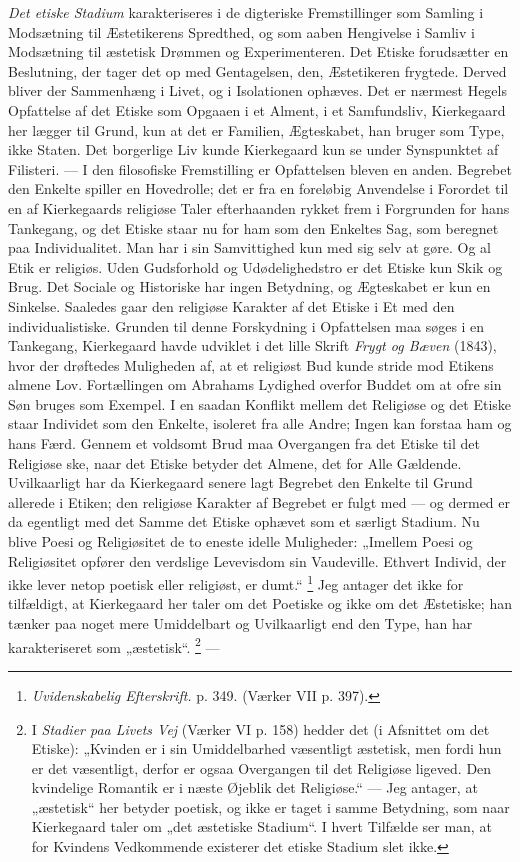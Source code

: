 \documentclass[12pt,a4paper,openany]{book}
\newcommand{\opage}[1]{\marginnote{\footnotesize\textit{[#1]}}}
\begin{document}
\textit{Det etiske Stadium} karakteriseres i de digteriske Fremstillinger som
Samling i Modsætning til Æstetikerens Spredthed, og som aaben Hengivelse i
Samliv i Modsætning til æstetisk Drømmen og Experimenteren. Det Etiske
forudsætter en Beslutning, der tager det op med Gentagelsen, den, Æstetikeren
frygtede. Derved bliver der Sammenhæng i Livet, og i Isolationen ophæves. Det
er nærmest Hegels Opfattelse af det
\setcounter{footnote}{0}%
\opage{159}Etiske som Opgaaen i et Alment, i et Samfundsliv, Kierkegaard her
lægger til Grund, kun at det er Familien, Ægteskabet, han bruger som Type, ikke
Staten. Det borgerlige Liv kunde Kierkegaard kun se under Synspunktet af
Filisteri. --- I den filosofiske Fremstilling er Opfattelsen bleven en anden.
Begrebet den Enkelte spiller en Hovedrolle; det er fra en foreløbig Anvendelse
i Forordet til en af Kierkegaards religiøse Taler efterhaanden rykket frem i
Forgrunden for hans Tankegang, og det Etiske staar nu for ham som den Enkeltes
Sag, som beregnet paa Individualitet. Man har i sin Samvittighed kun med sig
selv at gøre. Og al Etik er religiøs. Uden Gudsforhold og Udødelighedstro er
det Etiske kun Skik og Brug. Det Sociale og Historiske har ingen Betydning, og
Ægteskabet er kun en Sinkelse. Saaledes gaar den religiøse Karakter af det
Etiske i Et med den individualistiske. Grunden til denne Forskydning i
Opfattelsen maa søges i en Tankegang, Kierkegaard havde udviklet i det lille
Skrift \textit{Frygt og Bæven} (1843), hvor der drøftedes Muligheden af, at et
religiøst Bud kunde stride mod Etikens almene Lov. Fortællingen om Abrahams
Lydighed overfor Buddet om at ofre sin Søn bruges som Exempel. I en saadan
Konflikt mellem det Religiøse og det Etiske staar Individet som den Enkelte,
isoleret fra alle Andre; Ingen kan forstaa ham og hans Færd. Gennem et voldsomt
Brud maa Overgangen fra det Etiske til det Religiøse ske, naar det Etiske
betyder det Almene, det for Alle Gældende. Uvilkaarligt har da Kierkegaard
senere lagt Begrebet den Enkelte til Grund allerede i Etiken; den religiøse
Karakter af Begrebet er fulgt med --- og dermed er da egentligt med det Samme
det Etiske ophævet som et særligt Stadium. Nu blive Poesi og Religiøsitet de to
eneste idelle Muligheder: „Imellem Poesi og Religiøsitet opfører den verdslige
Levevisdom sin Vaudeville. Ethvert Individ, der ikke lever netop poetisk eller
religiøst, er dumt.“%
\footnote[1]{\textit{Uvidenskabelig Efterskrift.} p. 349. (Værker VII p. 397).}
Jeg antager det ikke for tilfældigt, at Kierkegaard her taler om det Poetiske
og ikke om det Æstetiske; han tænker paa noget
\setcounter{footnote}{0}%
\opage{160}mere Umiddelbart og Uvilkaarligt end den Type, han har
karakteriseret som „æstetisk“.%
\footnote[1]{I \textit{Stadier paa Livets Vej} (Værker VI p. 158) hedder det (i
Afsnittet om det Etiske): „Kvinden er i sin Umiddelbarhed væsentligt æstetisk,
men fordi hun er det væsentligt, derfor er ogsaa Overgangen til det Religiøse
ligeved. Den kvindelige Romantik er i næste Øjeblik det Religiøse.“ --- Jeg
antager, at „æstetisk“ her betyder poetisk, og ikke er taget i samme Betydning,
som naar Kierkegaard taler om „det æstetiske Stadium“. I hvert Tilfælde ser
man, at for Kvindens Vedkommende existerer det etiske Stadium slet ikke.} ---
\end{document}
